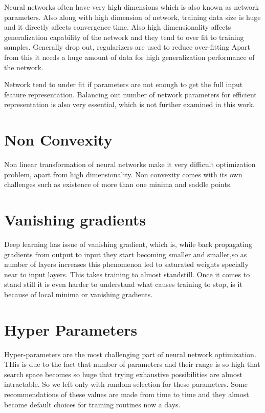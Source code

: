 Neural networks often have very high dimensions which is also known as network parameters. Also along with high dimension of network, training data size is huge and it directly affects convergence time. Also high dimensionality affects generalization capability of the network and they tend to over fit to training samples. Generally drop out, regularizers are used to reduce over-fitting Apart from this it needs a huge amount of data for high generalization performance of the network.

Network tend to under fit if parameters are not enough to get the full input feature representation. Balancing out number of network parameters for efficient representation is also very essential, which is not further examined in this work.

\section{Non Convexity}
Non linear transformation of neural networks make it very difficult optimization problem, apart from high dimensionality. Non convexity comes with its own challenges such as existence of more than one minima and saddle points.

\section{Vanishing gradients}
Deep learning has issue of vanishing gradient, which is, while back propagating gradients from output to input they start becoming smaller and smaller,so as number of layers increases this phenomenon led to saturated weights specially near to input layers. This takes training to almost standstill.
Once it comes to stand still it is even harder to understand what causes training to stop, is it because of local minima or vanishing gradients.

\section{Hyper Parameters}
Hyper-parameters are the most challenging part of neural network optimization. THis is due to the fact that number of parameters and their range is so high that search space becomes so huge that trying exhaustive possibilities are almost intractable. So we left only with random selection for these parameters. Some recommendations of these values are made from time to time and they almost become default choices for training routines now a days.

